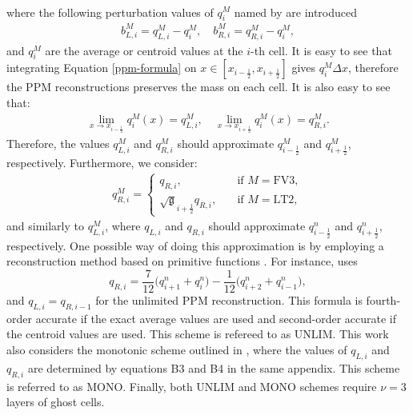 \documentclass[preprint,12pt]{elsarticle}
\begin{document}
\begin{linenumbers}
{\begin{align}
\end{align}
where the following perturbation values of  ${q_i^M}$ named by \cite{harris:2021} are introduced
\begin{align}
	b_{L,i}^M = q_{L,i}^M-{q_i^M}, \quad 
	b_{R,i}^M = q_{R,i}^M-{q_i^M},
\end{align}
and ${q_i^M}$
are the average or centroid values at the $i$-th cell.
It is easy to see that integrating Equation \eqref{ppm-formula} on $x \in [x_{i-\frac{1}{2}},x_{i+\frac{1}{2}}]$ gives $q^M_i\Delta x$, therefore the PPM reconstructions preserves the mass on each cell. It is also easy to see that:
\begin{align}
	\lim_{x \to x_{i-\frac{1}{2}}}{q^M_i}(x) = q_{L,i}^M,\quad
	\lim_{x \to x_{i+\frac{1}{2}}}{q^M_i}(x) = q_{R,i}^M.
\end{align}
Therefore, the values $q_{L,i}^M$ and $q_{R,i}^M$ should approximate ${q_{i-\frac{1}{2}}^M}$ and ${q_{i+\frac{1}{2}}^M}$, respectively.}
Furthermore, we consider:
\begin{align}
	\label{phi_L}
	q_{R,i}^M  =
	\begin{cases}
		q_{R,i},
		\quad &\text{if }{M=\text{FV3}},\\
		\sqrt{\mathfrak{g}}_{i+\frac{1}{2}} q_{R,i},
		\quad &\text{if }{M=\text{LT2}},
	\end{cases}
\end{align}
and similarly to $q_{L,i}^M$, where 
$q_{L,i}$ and $q_{R,i}$ should approximate ${q_{i-\frac{1}{2}}^n}$ and ${q_{i+\frac{1}{2}}^n}$, respectively.
One possible way of doing this approximation is by employing a reconstruction method based on primitive functions \cite[Chapter 17]{leveque:1990}.
For instance, \cite{colella:1984} uses
\begin{equation}
	\label{unlim-ppm}
	q_{R,i} = \frac{7}{12} \bigg( q_{i+1}^n + q_{i}^n \bigg) - \frac{1}{12} \bigg(q_{i+2}^n +q_{i-1}^n\bigg),
\end{equation}
and $q_{L,i}=q_{R,i-1}$ for the unlimited PPM reconstruction.
This formula is fourth-order accurate if the exact average values are used and second-order accurate if the centroid values are used.
This scheme is refereed to as UNLIM.
This work also considers the monotonic scheme outlined in \cite[Appendix B]{lin:2004}, where the values of $q_{L,i}$ and $q_{R,i}$ are determined by equations B3 and B4 in the same appendix.
This scheme is referred to as MONO.
Finally, both UNLIM and MONO schemes require $\nu=3$ layers of ghost cells.


\end{linenumbers}
\end{document}
